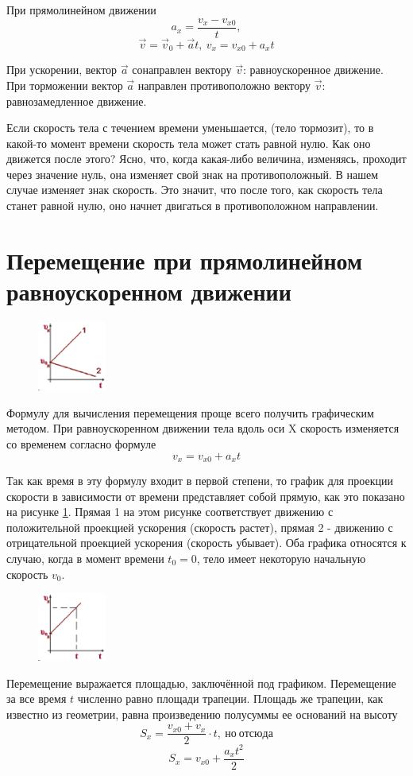 \documentclass[a6paper, 11pt]{diss_4}
\renewcommand{\'}{\,'}
\begin{document}
 При прямолинейном движении
\[a_x=\frac{v_x-v_{x0}}{t},\]
\[\vec{v}=\vec{v}_0+\vec{a}t,\ v_x=v_{x0}+a_{x}t\]

 При ускорении, вектор $\vec{a}$ сонаправлен вектору $\vec{v}$: равноускоренное
движение. При торможении вектор $\vec{a}$ направлен противоположно вектору
$\vec{v}$: равнозамедленное движение.

 Если скорость тела с течением времени уменьшается, (тело тормозит), то в
какой-то момент времени скорость тела может стать равной нулю. Как оно
движется после этого? Ясно, что, когда какая-либо величина, изменяясь,
проходит через значение нуль, она изменяет свой знак на противоположный. В
нашем случае изменяет знак скорость. Это значит, что после того, как скорость
тела станет равной нулю, оно начнет двигаться в противоположном направлении.


\section{Перемещение при прямолинейном равноускоренном движении}

\begin{figure}
\includegraphics[width=0.2\textwidth]{img/img11.eps}
\caption{}
\label{fig11}
\end{figure}
  Формулу для вычисления перемещения проще всего получить графическим
методом. При равноускоренном движении тела вдоль оси X скорость изменяется со
временем согласно формуле \[{v}_x={v}_{x0}+a_{x}t\]

Так как время в эту формулу входит в первой степени,
то график для проекции скорости в зависимости от времени представляет собой
прямую, как это показано на рисунке \ref{fig11}. Прямая 1 на этом рисунке соответствует
движению с положительной проекцией ускорения (скорость растет), прямая 2 -
движению с отрицательной проекцией ускорения (скорость убывает). Оба графика
относятся к случаю, когда в момент времени $t_0 = 0$, тело имеет некоторую
начальную скорость $v_0$.
\begin{figure}
\includegraphics[width=0.2\textwidth]{img/img12.eps}
\caption{}
\label{fig12}
\end{figure}
Перемещение выражается площадью, заключённой под
графиком. Перемещение за все время $t$ численно равно площади трапеции. Площадь
же трапеции, как известно из геометрии, равна произведению полусуммы ее
оснований на высоту
\[S_x=\frac{v_{x0}+v_x}{2}\cdot t,\  но\ отсюда \]
\[S_x=v_{x0}+\frac{a_x t^2}{2}\]
\end{document}
